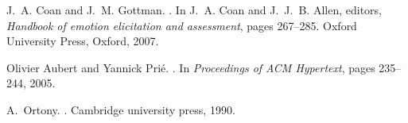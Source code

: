 \documentclass[10pt,a4paper,twocolumn]{article}
\begin{document}
{\begin{thebibliography}{10}
J.~A. Coan and J.~M. Gottman.
.
\newblock In J.~A. Coan and J.~J.~B. Allen, editors, {\em {Handbook of emotion
  elicitation and assessment}}, pages 267--285. Oxford University Press,
  Oxford, 2007.

Olivier Aubert and Yannick Pri{\'e}.
.
\newblock In {\em {Proceedings of ACM Hypertext}}, pages 235--244, 2005.

A.~Ortony.
.
\newblock Cambridge university press, 1990.

\end{thebibliography}
}%
\end{document}
